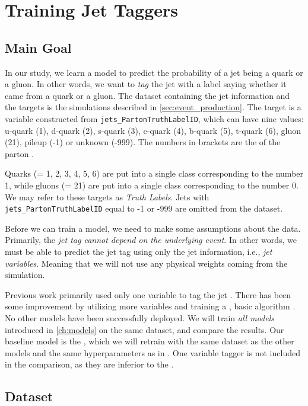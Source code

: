 \chapter{Training Jet Taggers}

\section{Main Goal}
\label{sec:training_and_evaluation}
In our study, we learn a model to predict the probability of a jet being a quark or a gluon.
In other words, we want to \emph{tag} the jet with a label saying whether it came from a quark or a gluon.
The dataset containing the jet information and the targets is the \MC simulations described in \cref{sec:event_production}.
The target is a variable constructed from \texttt{jets\_PartonTruthLabelID}, which can have nine values: u-quark (1), d-quark (2), s-quark (3), c-quark (4), b-quark (5), t-quark (6), gluon (21), pileup (-1) or unknown (-999).
The numbers in brackets are the \PID of the parton \cite{pdg}.

Quarks (\PID = 1, 2, 3, 4, 5, 6) are put into a single class corresponding to the number 1, while gluons (\PID = 21) are put into a single class corresponding to the number 0.
We may refer to these targets as \emph{Truth Labels}.
Jets with \texttt{jets\_PartonTruthLabelID} equal to -1 or -999 are omitted from the dataset.

Before we can train a model, we need to make some assumptions about the data.
Primarily, the \emph{jet tag cannot depend on the underlying event}.
In other words, we must be able to predict the jet tag using only the jet information, i.e., \emph{jet variables}.
Meaning that we will not use any physical weights coming from the \MC simulation.

Previous work primarily used only one variable to tag the jet \cite{ntrk_tag}.
There has been some improvement by utilizing more variables and training a \bdt \cite{bdt_tag}, basic \ml algorithm \cite{bdt}.
No other models have been successfully deployed.
We will train \emph{all models} introduced in \cref{ch:models} on the same dataset, and compare the results.
Our baseline model is the \bdt, which we will retrain with the same dataset as the other models and the same hyperparameters as in \cite{bdt_tag}.
One variable tagger is not included in the comparison, as they are inferior to the \bdt \cite{bdt_tag}.

\section{Dataset}
\label{sec:dataset}

